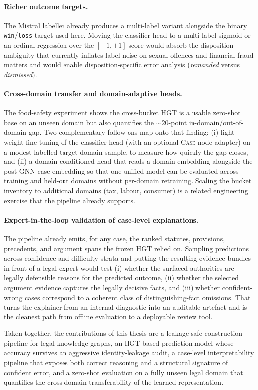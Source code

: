 \paragraph{Richer outcome targets.} The Mistral labeller already
produces a multi-label variant alongside the binary
\texttt{win}/\texttt{loss} target used here. Moving the classifier
head to a multi-label sigmoid or an ordinal regression over the
$[-1, +1]$ score would absorb the disposition ambiguity that
currently inflates label noise on sexual-offences and financial-fraud
matters and would enable disposition-specific error analysis
(\emph{remanded} versus \emph{dismissed}).

\paragraph{Cross-domain transfer and domain-adaptive heads.} The
food-safety experiment shows the cross-bucket HGT is a usable
zero-shot base on an unseen domain but also quantifies the
$\sim\!20$-point in-domain/out-of-domain gap. Two complementary
follow-ons map onto that finding: (i) light-weight fine-tuning of
the classifier head (with an optional \textsc{Case}-node adapter) on
a modest labelled target-domain sample, to measure how quickly the
gap closes, and (ii) a domain-conditioned head that reads a domain
embedding alongside the post-GNN case embedding so that one unified
model can be evaluated across training and held-out domains without
per-domain retraining. Scaling the bucket inventory to additional
domains (tax, labour, consumer) is a related engineering exercise
that the pipeline already supports.

\paragraph{Expert-in-the-loop validation of case-level explanations.}
The  pipeline already emits, for any case, the
ranked statutes, provisions, precedents, and argument spans the frozen
HGT relied on. Sampling
predictions across confidence and difficulty strata and putting the
resulting evidence bundles in front of a legal expert would test
(i) whether the surfaced authorities are legally defensible reasons
for the predicted outcome, (ii) whether the selected argument evidence
captures the legally decisive facts, and (iii) whether confident-wrong
cases correspond to a coherent class of distinguishing-fact omissions.
That turns the explainer from an
internal diagnostic into an auditable artefact and is the cleanest
path from offline evaluation to a deployable review tool.

\medskip

Taken together, the contributions of this thesis are a
leakage-safe construction pipeline for legal knowledge graphs, an
HGT-based prediction model whose accuracy survives an aggressive
identity-leakage audit, a case-level interpretability pipeline that
exposes both correct reasoning and a structural signature of confident
error, and a zero-shot evaluation on a fully unseen legal domain that
quantifies the cross-domain transferability of the learned
representation.
